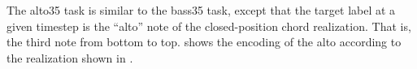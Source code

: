 
The \gls{alto35} task is similar to the \gls{bass35} task,
except that the target label at a given timestep is the
``alto'' note of the \gls{closed-position} chord
realization. That is, the third note from bottom to top.
 shows the encoding of the alto according
to the realization shown in .




